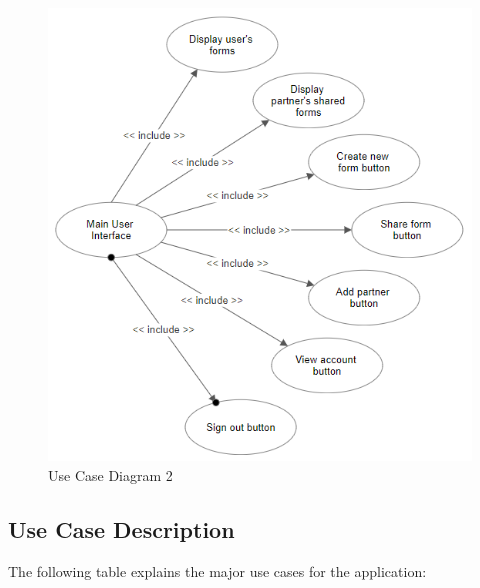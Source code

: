     \begin{figure}[h]
        \center
        \includegraphics[width=150mm]{../figures/UseCaseInterface}
        \caption{Use Case Diagram 2}
    \end{figure}

    \clearpage

    \subsection{Use Case Description}

        The following table explains the major use cases for the application:\\

